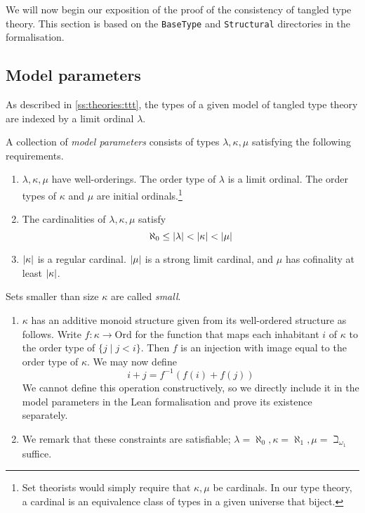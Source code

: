 We will now begin our exposition of the proof of the consistency of tangled type theory.
This section is based on the \texttt{BaseType} and \texttt{Structural} directories in the formalisation.

\subsection{Model parameters}
\label{ss:structure:params}

As described in \cref{ss:theories:ttt}, the types of a given model of tangled type theory are indexed by a limit ordinal \( \lambda \).
\begin{definition}
    A collection of \emph{model parameters} consists of types \( \lambda, \kappa, \mu \) satisfying the following requirements.
    \begin{enumerate}
        \item \( \lambda, \kappa, \mu \) have well-orderings.
        The order type of \( \lambda \) is a limit ordinal.
        The order types of \( \kappa \) and \( \mu \) are initial ordinals.\footnote{Set theorists would simply require that \( \kappa, \mu \) be cardinals. In our type theory, a cardinal is an equivalence class of types in a given universe that biject.}
        \item The cardinalities of \( \lambda, \kappa, \mu \) satisfy
        \[ \aleph_0 \leq \left|\lambda\right| < \left|\kappa\right| < \left|\mu\right| \]
        \item \( \left|\kappa\right| \) is a regular cardinal.
        \( \left|\mu\right| \) is a strong limit cardinal, and \( \mu \) has cofinality at least \( \left|\kappa\right| \).
    \end{enumerate}
\end{definition}
\begin{definition}
    Sets smaller than size \( \kappa \) are called \emph{small}.
\end{definition}
\begin{remarks}\mbox\negthinspace
    \begin{enumerate}
        \item {} \( \kappa \) has an additive monoid structure given from its well-ordered structure as follows.
        Write \( f : \kappa \to \mathrm{Ord} \) for the function that maps each inhabitant \( i \) of \( \kappa \) to the order type of \( \{ j \mid j < i \} \).
        Then \( f \) is an injection with image equal to the order type of \( \kappa \).
        We may now define
        \[ i + j = f^{-1}(f(i) + f(j)) \]
        We cannot define this operation constructively, so we directly include it in the model parameters in the Lean formalisation and prove its existence separately.
        \item {}
        We remark that these constraints are satisfiable; \( \lambda = \aleph_0, \kappa = \aleph_1, \mu = \beth_{\omega_1} \) suffice.
    \end{enumerate}
\end{remarks}

